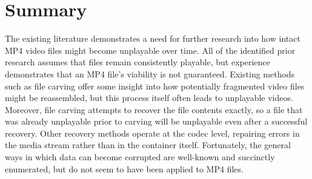 \section{Summary}

The existing literature demonstrates a need for further research into how intact MP4 video files might become unplayable over time. All of the identified prior research assumes that files remain consistently playable, but experience demonstrates that an MP4 file's viability is not guaranteed. Existing methods such as file carving offer some insight into how potentially fragmented video files might be reassembled, but this process itself often leads to unplayable videos. Moreover, file carving attempts to recover the file contents exactly, so a file that was already unplayable prior to carving will be unplayable even after a successful recovery. Other recovery methods operate at the codec level, repairing errors in the media stream rather than in the container itself. Fortunately, the general ways in which data can become corrupted are well-known and succinctly enumerated, but do not seem to have been applied to MP4 files.